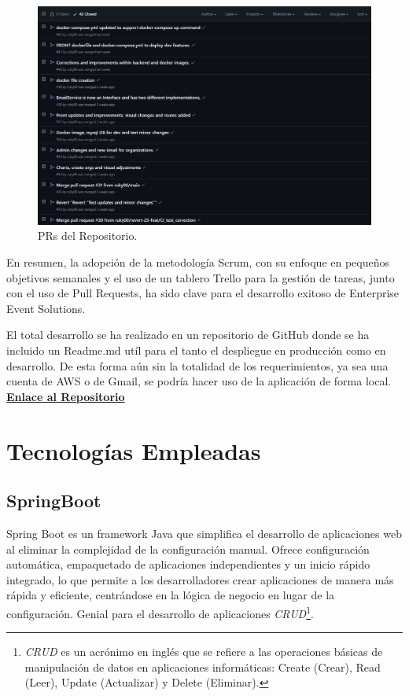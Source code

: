 \begin{figure}[h]
    \centering
    \includegraphics[width=\linewidth]{PRs.png}
    \caption{PRs del Repositorio.}
    \label{fig:metodologias2}
\end{figure}

En resumen, la adopción de la metodología Scrum, con su enfoque en pequeños objetivos semanales y el uso de un tablero Trello para la gestión de tareas, 
junto con el uso de Pull Requests, ha sido clave para el desarrollo exitoso de Enterprise Event Solutions.

El total desarrollo se ha realizado en un repositorio de GitHub donde se ha incluido un Readme.md utíl para el tanto el despliegue en producción como en desarrollo. De esta forma
aún sin la totalidad de los requerimientos, ya sea una cuenta de AWS o de Gmail, se podría hacer uso de la aplicación de forma local.  \textbf{\href{https://github.com/ruky00/EnterpriseEventSolutions}{Enlace al Repositorio}}



\section{Tecnologías Empleadas}

\subsection{SpringBoot}
Spring Boot\cite{spring-boot} es un framework Java que simplifica el desarrollo de aplicaciones web al eliminar la 
complejidad de la configuración manual. Ofrece configuración automática, empaquetado de aplicaciones independientes y un inicio rápido integrado, 
lo que permite a los desarrolladores crear aplicaciones de manera más rápida y eficiente, centrándose en la lógica de negocio en lugar de la configuración. 
Genial para el desarrollo de aplicaciones \textit{CRUD}\footnote{\textit{CRUD} es un acrónimo en inglés que se refiere a las operaciones 
básicas de manipulación de datos en aplicaciones informáticas: Create (Crear), Read (Leer), Update (Actualizar) y Delete (Eliminar).}.
